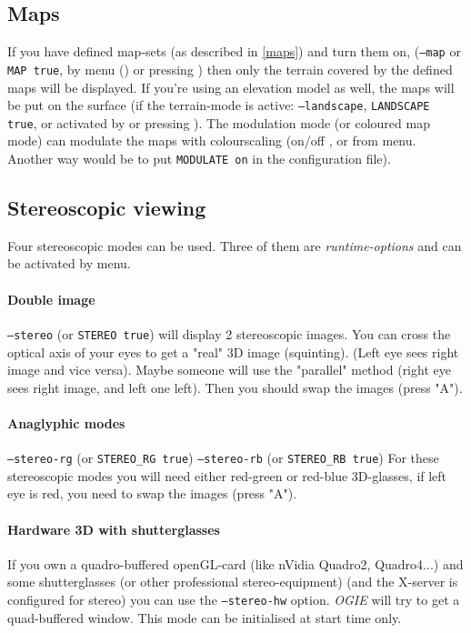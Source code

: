 \subsection{Maps}
If you have defined map-sets (as described in \ref{maps}) and turn them on,
(\texttt{--map} or \texttt{MAP true}, by menu () or pressing ) then only the terrain covered by the
defined maps will be displayed. If you're using an elevation model as well, the
maps will be put on the surface (if the terrain-mode is active: \texttt{--landscape},
\texttt{LANDSCAPE true}, or activated by  or pressing ).
The modulation mode (or coloured map mode) can modulate the maps with colourscaling (on/off , or  from menu. Another way would be to put \texttt{MODULATE on} in the configuration file).




\subsection{Stereoscopic viewing}

Four stereoscopic modes can be used.
Three of them are \emph{runtime-options} and can be activated by menu.

\paragraph{Double image}
\texttt{--stereo} (or \texttt{STEREO true})
will display 2 stereoscopic images. You can cross the optical axis of your eyes
to get a "real" 3D image (squinting). (Left eye sees right image and vice versa).
Maybe someone will use the "parallel" method (right eye sees right image, and left
one left). Then you should swap the images (press "A").

\paragraph{Anaglyphic modes}
\texttt{--stereo-rg} (or \texttt{STEREO\_RG true})
\texttt{--stereo-rb} (or \texttt{STEREO\_RB true})
For these stereoscopic modes you will need either  red-green or  red-blue
3D-glasses, if left eye is red, you need to swap the images (press "A").

\paragraph{Hardware 3D with shutterglasses}
If you own a  quadro-buffered openGL-card (like nVidia Quadro2, Quadro4...) and
some shutterglasses (or other professional stereo-equipment)
(and the X-server is configured for stereo) you can use the
\texttt{--stereo-hw} option. \emph{OGIE} will try to get a quad-buffered window.
This mode can be initialised at start time only.


